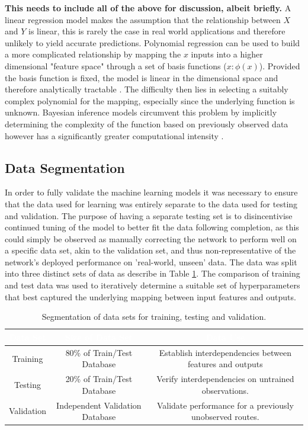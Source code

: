 \documentclass[a4paper, 10pt]{article}
\numberwithin{equation}{section}
\begin{document}
\textbf{This needs to include all of the above for discussion, albeit briefly.} 
A linear regression model makes the assumption that the relationship between $X$ and $Y$ is linear, this is rarely the case in real world applications and therefore unlikely to yield accurate predictions. Polynomial regression can be used to build a more complicated relationship by mapping the $x$ inputs into a higher dimensional "feature space" through a set of basis functions \big($x:\phi (x) $\big). Provided the basis function is fixed, the model is linear in the dimensional space and therefore analytically tractable \cite{rasmussen_williams_2008}. The difficulty then lies in selecting a suitably complex polynomial for the mapping, especially since the underlying function is unknown. Bayesian inference models circumvent this problem by implicitly determining the complexity of the function based on previously observed data however has a significantly greater computational intensity \cite{bishop_2013}.  


\subsection{Data Segmentation}
In order to fully validate the machine learning models it was necessary to ensure that the data used for learning was entirely separate to the data used for testing and validation. The purpose of having a separate testing set is to disincentivise continued tuning of the model to better fit the data following completion, as this could simply be observed as manually correcting the network to perform well on a specific data set, akin to the validation set, and thus non-representative of the network's deployed performance on 'real-world, unseen' data. The data was split into three distinct sets of data as describe in Table \ref{tbl:data_segmentation}. The comparison of training and test data was used to iteratively determine a suitable set of hyperparameters that best captured the underlying mapping between input features and outputs.

\begin{table}[h!]
    \centering
    \small
    \caption{Segmentation of data sets for training, testing and validation.}
    \label{tbl:data_segmentation}
    \begin{tabular}{|c|c|c|}
        \hline 
         \cellcolor{gray!120}\textcolor{white}{\textbf{Data Set}} & \cellcolor{gray!120}\textcolor{white}{\textbf{Size of Data Set}} & \cellcolor{gray!120}\textcolor{white}{\textbf{Data Use}} \\ 
         \hline
         \hline
         Training & 80\% of Train/Test Database & Establish interdependencies between features and outputs  \\ 
         Testing & 20\% of Train/Test Database & Verify interdependencies on untrained observations. \\ 
         Validation & Independent Validation Database & Validate performance for a previously unobserved routes. \\ 
    \hline
    \end{tabular}
\end{table}
\end{document}
